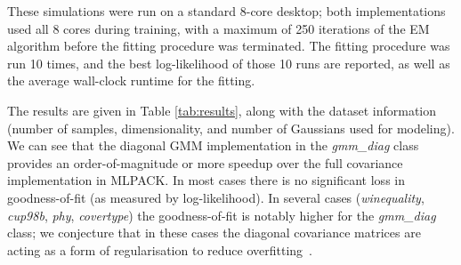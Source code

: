 These simulations were run on a standard 8-core desktop; both implementations
used all 8 cores during training, with a maximum of 250 iterations of the EM
algorithm before the fitting procedure was terminated.  The fitting procedure
was run 10 times, and the best log-likelihood of those 10 runs are reported,
as well as the average wall-clock runtime for the fitting.

The results are given in Table \ref{tab:results}, along with the dataset
information (number of samples, dimensionality, and number of Gaussians
used for modeling).  We can see that the diagonal GMM implementation in 
the {\it gmm\_diag} class provides an order-of-magnitude or more speedup over the full covariance
implementation in MLPACK.
In most cases there is no significant loss in goodness-of-fit (as measured by log-likelihood).
In several cases ({\it winequality}, {\it cup98b}, {\it phy}, {\it covertype})
the goodness-of-fit is notably higher for the {\it gmm\_diag} class;
we conjecture that in these cases the diagonal covariance matrices are acting as a form of regularisation to reduce overfitting~\cite{Bishop_2006}.



